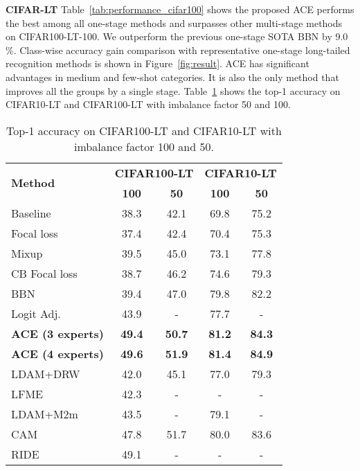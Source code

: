 \textbf{CIFAR-LT} Table~\ref{tab:performance_cifar100} shows the proposed ACE performs the best among all one-stage methods and surpasses other multi-stage methods on CIFAR100-LT-100. We outperform the previous one-stage SOTA BBN by 9.0$\%$. Class-wise accuracy gain comparison with representative one-stage long-tailed recognition methods is shown in Figure~\ref{fig:result}. ACE has significant advantages in medium and few-shot categories. It is also the only method that improves all the groups by a single stage. Table~\ref{tab:performance_cifar} shows the top-1 accuracy on CIFAR10-LT and CIFAR100-LT with imbalance factor 50 and 100.\\

\begin{table}[t]
\small
\begin{center}
\begin{tabular}{p{2.7cm}|c c|c c}
\toprule[1.5pt]
 \multirow{2}{*}{\textbf{Method}} & \multicolumn{2}{c|}{\textbf{CIFAR100-LT}}  & \multicolumn{2}{c}{\textbf{CIFAR10-LT}}\\
 \cline{2-5}
 & \textbf{100} & \textbf{50} & \textbf{100} & \textbf{50} \\\hline
 Baseline & 38.3 & 42.1 & 69.8 & 75.2 \\
 Focal loss \cite{lin2017focal} & 37.4 & 42.4  & 70.4 & 75.3\\
 Mixup \cite{zhang2017mixup} & 39.5 & 45.0 & 73.1 & 77.8\\
 CB Focal loss \cite{cui2019class} & 38.7 & 46.2  & 74.6 & 79.3\\
 BBN \cite{zhou2020bbn} &39.4 &47.0  &79.8 &82.2\\
 Logit Adj.\cite{menon2020long} & 43.9 & - & 77.7 & -\\
 \rowcolor{yellow!20} \textbf{ACE (3 experts)} &\textbf{49.4} & \textbf{50.7} &\textbf{81.2} &\textbf{84.3} \\
  \rowcolor{yellow!20} \textbf{ACE (4 experts)} &\textbf{49.6} & \textbf{51.9} &\textbf{81.4} &\textbf{84.9} \\\hline
 LDAM+DRW \cite{cao2019learning} &42.0 &45.1 &77.0 &79.3\\
 LFME \cite{xiang2020learning}& 42.3 &- &- & -\\
 LDAM+M2m \cite{kim2020m2m}&43.5&- &79.1& - \\
 CAM \cite{zhang2021bag}&47.8 &51.7  &80.0 &83.6 \\
 RIDE \cite{wang2020long}&49.1 &- &- &- \\
\bottomrule[1.5pt]
\end{tabular}
\end{center}
\caption{Top-1 accuracy on CIFAR100-LT and CIFAR10-LT with imbalance factor 100 and 50.}
\label{tab:performance_cifar}
\end{table}

